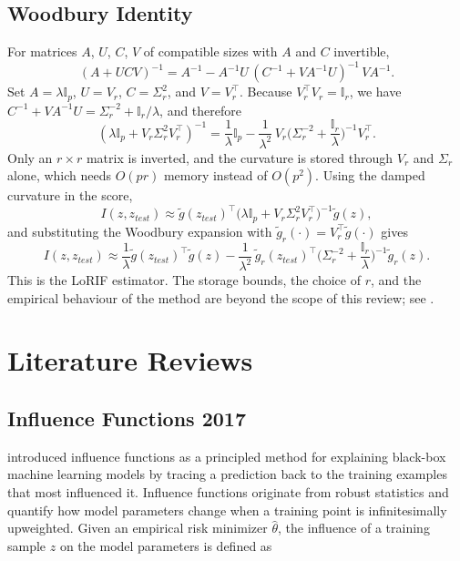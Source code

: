 \documentclass{article}
\newcommand{\hth}{\hat{\theta}}                 %
\newcommand{\gt}[1]{\tilde{g}(#1)}              %
\newcommand{\gtr}[1]{\tilde{g}_r(#1)}           %
\begin{document}
\subsection{Woodbury Identity}
For matrices $A$, $U$, $C$, $V$ of compatible sizes with $A$ and $C$ invertible,
\begin{equation}
    (A+UCV)^{-1}=A^{-1}-A^{-1}U\,(C^{-1}+VA^{-1}U)^{-1}\,VA^{-1}.
\end{equation}
Set $A=\lambda\mathbb{I}_p$, $U=V_r$, $C=\Sigma_r^2$, and $V=V_r^\top$. Because $V_r^\top V_r=\mathbb{I}_r$, we have $C^{-1}+VA^{-1}U=\Sigma_r^{-2}+\mathbb{I}_r/\lambda$, and therefore
\begin{equation}
    (\lambda\mathbb{I}_p+V_r\Sigma_r^2V_r^\top)^{-1}=\frac{1}{\lambda}\mathbb{I}_p-\frac{1}{\lambda^2}\,V_r\Big(\Sigma_r^{-2}+\frac{\mathbb{I}_r}{\lambda}\Big)^{-1}V_r^\top.
\end{equation}
Only an $r\times r$ matrix is inverted, and the curvature is stored through $V_r$ and $\Sigma_r$ alone, which needs $O(pr)$ memory instead of $O(p^2)$. Using the damped curvature in the score,
\begin{equation}\label{eq:damped}
    I(z,z_{test})\approx\gt{z_{test}}^\top\big(\lambda\mathbb{I}_p+V_r\Sigma_r^2V_r^\top\big)^{-1}\gt{z},
\end{equation}
and substituting the Woodbury expansion with $\gtr{\cdot}=V_r^\top\gt{\cdot}$ gives
\begin{equation}\label{eq:lorif-derived}
    I(z,z_{test})\approx\frac{1}{\lambda}\gt{z_{test}}^\top\gt{z}-\frac{1}{\lambda^2}\,\gtr{z_{test}}^\top\Big(\Sigma_r^{-2}+\frac{\mathbb{I}_r}{\lambda}\Big)^{-1}\gtr{z}.
\end{equation}
This is the LoRIF estimator. The storage bounds, the choice of $r$, and the empirical behaviour of the method are beyond the scope of this review; see \textcite{loRIF}.


\section{Literature Reviews}


\subsection{Influence Functions 2017}
\textcite{influence-functions-2017} introduced influence functions as a principled method for explaining black-box machine learning models by tracing a prediction back to the training examples that most influenced it. Influence functions originate from robust statistics and quantify how model parameters change when a training point is infinitesimally upweighted. Given an empirical risk minimizer $\hth$, the influence of a training sample $z$ on the model parameters is defined as
\end{document}
